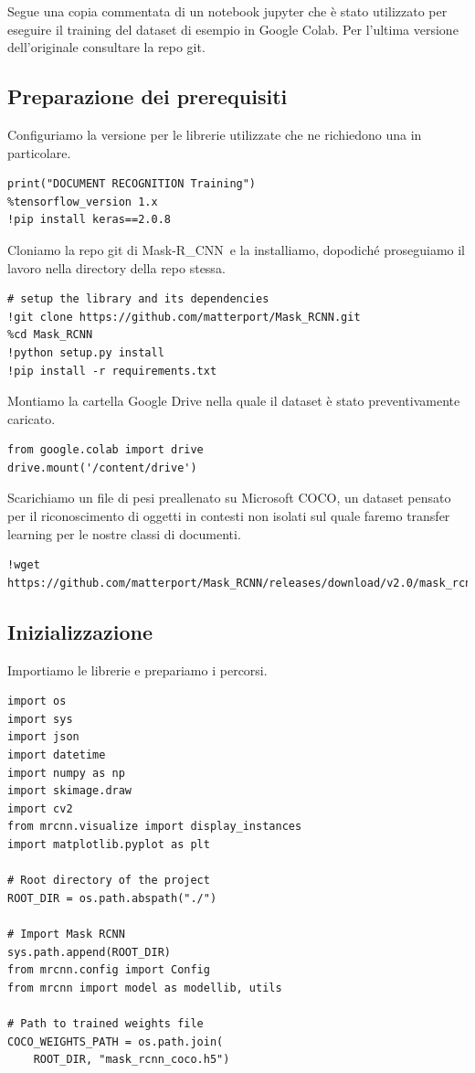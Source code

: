 \documentclass[12pt,a4paper]{article}
\newcommand{\mrcnn}{Mask-R\_CNN}
\begin{document}
Segue una copia commentata di un notebook jupyter che è stato utilizzato
per eseguire il training del dataset di esempio in Google Colab. Per
l'ultima versione dell'originale consultare la repo git.

\subsection{Preparazione dei prerequisiti}

Configuriamo la versione per le librerie utilizzate che ne richiedono
una in particolare.

\begin{verbatim}
print("DOCUMENT RECOGNITION Training")
%tensorflow_version 1.x
!pip install keras==2.0.8
\end{verbatim}

Cloniamo la repo git di \mrcnn\ e la installiamo, dopodiché proseguiamo
il lavoro nella directory della repo stessa.

\begin{verbatim}
# setup the library and its dependencies
!git clone https://github.com/matterport/Mask_RCNN.git
%cd Mask_RCNN
!python setup.py install
!pip install -r requirements.txt
\end{verbatim}

Montiamo la cartella Google Drive nella quale il dataset è stato
preventivamente caricato.

\begin{verbatim}
from google.colab import drive
drive.mount('/content/drive')
\end{verbatim}

Scarichiamo un file di pesi preallenato su Microsoft COCO, un dataset
pensato per il riconoscimento di oggetti in contesti non isolati sul
quale faremo transfer learning per le nostre classi di documenti.

\begin{verbatim}
!wget https://github.com/matterport/Mask_RCNN/releases/download/v2.0/mask_rcnn_coco.h5
\end{verbatim}

\subsection{Inizializzazione}

Importiamo le librerie e prepariamo i percorsi.

\begin{verbatim}
import os
import sys
import json
import datetime
import numpy as np
import skimage.draw
import cv2
from mrcnn.visualize import display_instances
import matplotlib.pyplot as plt

# Root directory of the project
ROOT_DIR = os.path.abspath("./")

# Import Mask RCNN
sys.path.append(ROOT_DIR)
from mrcnn.config import Config
from mrcnn import model as modellib, utils

# Path to trained weights file
COCO_WEIGHTS_PATH = os.path.join(
    ROOT_DIR, "mask_rcnn_coco.h5")
\end{verbatim}
\end{document}
